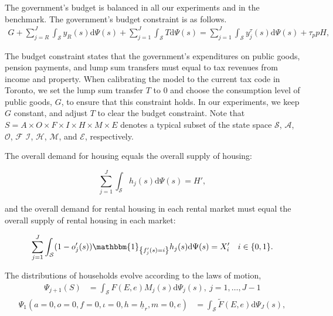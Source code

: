 \documentclass[parskip=full]{article}
\newcommand{\indicator}[1]{\mathbbm{1}_{\left\{ {#1} \right\} }}
\begin{document}
The government's budget is balanced in all our experiments and in the benchmark. The government's budget constraint is as follows.
\begin{align}\label{eq:gbc}
  G + \sum_{j=R}^J \int_\mathcal{S} y_{R}(s) \mathrm{d}\Psi(s) + \sum_{j=1}^J \int_\mathcal{S} T \mathrm{d}\Psi(s) = \sum_{j=1}^J \int_\mathcal{S}y^{\tau}_{j}(s) \mathrm{d}\Psi(s)+\tau_p p H,
\end{align}

\noindent The budget constraint states that the government's expenditures on public goods, pension payments, and lump sum transfers must equal to tax revenues from income and property. When calibrating the model to the current tax code in Toronto, we set the lump sum transfer $T$ to 0 and choose the consumption level of public goods, $G$, to ensure that this constraint holds. In our experiments, we keep $G$ constant, and adjust $T$ to clear the budget constraint. Note that $S=A\times O \times F \times I \times H \times M \times E$ denotes a typical subset of the state space $\mathcal{S}$, $\mathcal{A}$, $\mathcal{O}$, $\mathcal{F}$ $\mathcal{I}$, $\mathcal{H}$, $\mathcal{M}$, and $\mathcal{E}$, respectively.

The overall demand for housing equals the overall supply of housing:

\begin{equation}
\label{eq:housing_clearing_condition}
  \sum_{j=1}^J \int_\mathcal{S} h_{j}(s) \mathrm{d}\Psi(s) = H',
\end{equation}

\noindent and the overall demand for rental housing in each rental market must equal the overall supply of rental housing in each market:

\begin{equation}
\label{eq:rental_housing_clearing_condition}
  \sum_{j=1}^J \int_\mathcal{S} (1-o'_{j}(s))\indicator{f'_{j}(s)=i}h_{j}(s) \mathrm{d}\Psi(s) = X'_{i} \quad i \in \{0,1\}.
\end{equation}

The distributions of households evolve according to the laws of motion,
\begin{align}
\Psi_{j+1}(S) &=\int_{\mathcal{S}} F(E,e)M_{j}(s)\mathrm{d}\Psi_{j}(s),\ j=1,\ldots,J-1\label{eq:lom1}
\end{align}
\begin{align}
\Psi_{1}(a=0,o=0,f=0,\iota=0,h=\underline{h}_{r},m=0,e) &=\int_{\mathcal{S}}\tilde{F}(E,e) \mathrm{d}\Psi_{J}(s),\label{eq:lom2}
\end{align}
\end{document}
